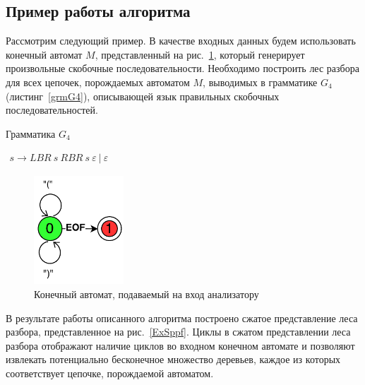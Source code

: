 \subsection{Пример работы алгоритма}
Рассмотрим следующий пример. В качестве входных данных будем использовать конечный автомат $M$, представленный на рис.~\ref{InputGraph}, который генерирует произвольные скобочные последовательности. Необходимо построить лес разбора для всех цепочек, порождаемых автоматом $M$, выводимых в грамматике $G_4$ (листинг~\ref{grmG4}), описывающей язык правильных скобочных последовательностей.
\begin{listing}
\caption{Грамматика $G_4$}
\label{grmG4}
\centering
$\begin{array}{rl}
s \rightarrow LBR \ s \ RBR \ s \ \varepsilon \  | \ \varepsilon 
\end{array}$
\end{listing}

\begin{figure}
 \centering
 \includegraphics[width=0.3\textwidth]{Ragozina/pics/ExampleInputGraph.pdf}
 \caption{Конечный автомат, подаваемый на вход анализатору }
 \label{InputGraph}
\end{figure}

В результате работы описанного алгоритма построено сжатое представление леса разбора, представленное на рис.~\ref{ExSppf}. Циклы в сжатом представлении леса разбора отображают наличие циклов во входном конечном автомате и позволяют извлекать потенциально бесконечное множество деревьев, каждое из которых соответствует цепочке, порождаемой автоматом.

